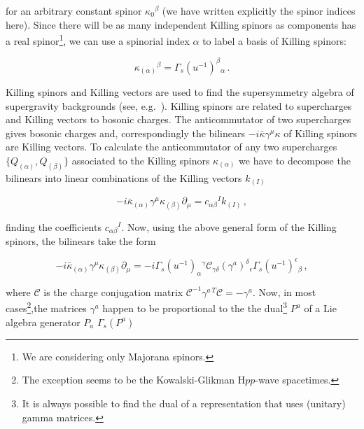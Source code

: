 \documentclass[12pt,a4paper]{article}
\begin{document}
\noindent
for an arbitrary constant spinor $\kappa_{0}{}^{\beta}$ (we have
written explicitly the spinor indices here). Since there will be as
many independent Killing spinors as components has a real
spinor\footnote{We are considering only Majorana spinors.}, we can use
a spinorial index $\alpha$ to label a basis of Killing spinors:

\begin{equation}
\kappa_{(\alpha)}{}^{\beta}=   \Gamma_{s}(u^{-1})^{\beta}{}_{\alpha}\, .
\end{equation}

Killing spinors and Killing vectors are used to find the supersymmetry
algebra of supergravity backgrounds (see,
e.g.~\cite{Gauntlett:1998fz,Figueroa-O'Farrill:1999va,Ortin:2002qb}).
Killing spinors are related to supercharges and Killing vectors to
bosonic charges. The anticommutator of two supercharges gives bosonic
charges and, correspondingly the bilinears
$-i\bar{\kappa}\gamma^{\mu}\kappa$ of Killing spinors are Killing
vectors. To calculate the anticommutator of any two supercharges
$\{Q_{(\alpha)},Q_{(\beta)}\}$ associated to the Killing spinors
$\kappa_{(\alpha)}$ we have to decompose the bilinears into linear
combinations of the Killing vectors $k_{(I)}$

\begin{equation}
-i\bar{\kappa}_{(\alpha)}\gamma^{\mu}\kappa_{(\beta)}\partial_{\mu}
= c_{\alpha\beta}{}^{I}k_{(I)}\, ,  
\end{equation}

\noindent
finding the coefficients $c_{\alpha\beta}{}^{I}$. Now, using the above
general form of the Killing spinors, the bilinears take the form

\begin{equation}
-i\bar{\kappa}_{(\alpha)}\gamma^{\mu}\kappa_{(\beta)}\partial_{\mu} = 
-i\Gamma_{s}(u^{-1})_{\alpha}{}^{\gamma}\mathcal{C}_{\gamma\delta}
(\gamma^{a})^{\delta}{}_{\epsilon} \Gamma_{s}(u^{-1})^{\epsilon}{}_{\beta}\, ,
\end{equation}

\noindent
where $\mathcal{C}$ is the charge conjugation matrix
$\mathcal{C}^{-1}\gamma^{a\, T}\mathcal{C}= -\gamma^{a}$.  Now, in
most cases\footnote{The exception seems to be the Kowalski-Glikman
  H$pp$-wave spacetimes.},the matrices $\gamma^{a}$ happen to be
proportional to the the dual\footnote{It is always possible to find
  the dual of a representation that uses (unitary) gamma matrices.}
$P^{a}$ of a Lie algebra generator $P_{a}$ $\Gamma_{s}(P^{a})$
\end{document}
